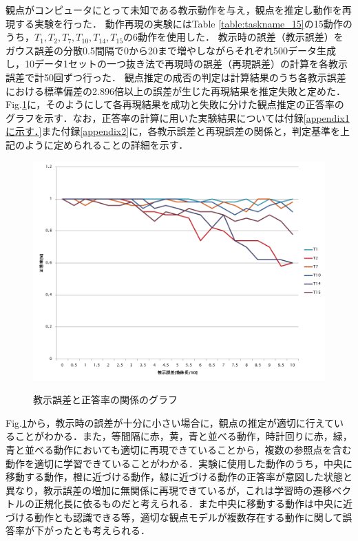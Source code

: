 観点がコンピュータにとって未知である教示動作を与え，観点を推定し動作を再現する実験を行った．
動作再現の実験にはTable \ref{table:taskname_15}の15動作のうち，$T_{1} , T_{2} , T_{7} , T_{10} , T_{14} , T_{15}$の6動作を使用した．
教示時の誤差（教示誤差）をガウス誤差の分散0.5間隔で0から20まで増やしながらそれぞれ500データ生成し，10データ1セットの一つ抜き法で再現時の誤差（再現誤差）の計算を各教示誤差で計50回ずつ行った．
観点推定の成否の判定は計算結果のうち各教示誤差における標準偏差の2.896倍以上の誤差が生じた再現結果を推定失敗と定めた．Fig.\ref{figure:success_rate}に，そのようにして各再現結果を成功と失敗に分けた観点推定の正答率のグラフを示す．なお，正答率の計算に用いた実験結果については付録\ref{appendix1に示す．}また付録\ref{appendix2}に，各教示誤差と再現誤差の関係と，判定基準を上記のように定められることの詳細を示す．
	\begin{figure}[h]
		\begin{center}
			\includegraphics[width=14cm]{chart2.png} \\ %
			\caption{教示誤差と正答率の関係のグラフ}
			\label{figure:success_rate}
		\end{center}
	\end{figure}

Fig.\ref{figure:success_rate}から，教示時の誤差が十分に小さい場合に，観点の推定が適切に行えていることがわかる．また，等間隔に赤，黄，青と並べる動作，時計回りに赤，緑，青と並べる動作においても適切に再現できていることから，複数の参照点を含む動作を適切に学習できていることがわかる．実験に使用した動作のうち，中央に移動する動作，橙に近づける動作，緑に近づける動作の正答率が意図した状態と異なり，教示誤差の増加に無関係に再現できているが，これは学習時の遷移ベクトルの正規化長に依るものだと考えられる．また中央に移動する動作は中央に近づける動作とも認識できる等，適切な観点モデルが複数存在する動作に関して誤答率が下がったとも考えられる．





